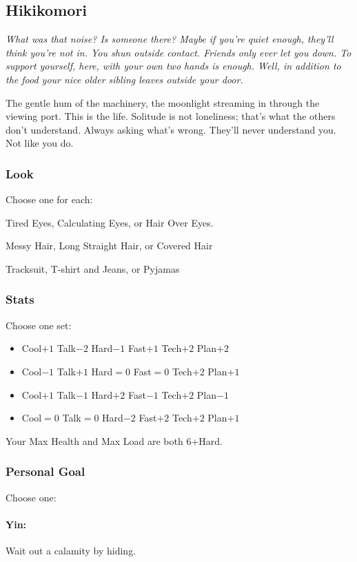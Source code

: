 \subsection{Hikikomori}
{\itshape What was that noise? Is someone there? Maybe if you're quiet
  enough, they'll think you're not in. You shun outside
  contact. Friends only ever let you down. To support yourself, here,
  with your own two hands is enough. Well, in addition to the food
  your nice older sibling leaves outside your door.

The gentle hum of the machinery, the moonlight streaming in through
the viewing port. This is the life. Solitude is not loneliness; that's
what the others don't understand. Always asking what's wrong. They'll
never understand you. Not like you do.}

\subsubsection{Look}
Choose one for each:

Tired Eyes, Calculating Eyes, or Hair Over Eyes.

Messy Hair, Long Straight Hair, or Covered Hair

Tracksuit, T-shirt and Jeans, or Pyjamas

\subsubsection{Stats}
Choose one set:
\begin{itemize}
\setlength\itemsep{0em}
\item Cool$+1$ Talk$-2$ Hard$-1$ Fast$+1$ Tech$+2$ Plan$+2$
\item Cool$-1$ Talk$+1$ Hard${=}0$ Fast${=}0$ Tech$+2$ Plan$+1$
\item Cool$+1$ Talk$-1$ Hard$+2$ Fast$-1$ Tech$+2$ Plan$-1$
\item Cool${=}0$ Talk${=}0$ Hard$-2$ Fast$+2$ Tech$+2$ Plan$+1$
\end{itemize}

Your Max Health and Max Load are both 6+Hard.

\subsubsection{Personal Goal}
Choose one:
\paragraph{Yin:} Wait out a calamity by hiding.
